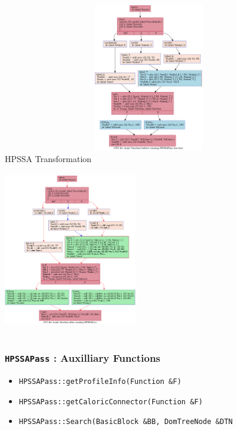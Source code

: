 \documentclass{beamer}
\begin{document}
\begin{frame}{HPSSA Transformation}
	\includegraphics[width=4.8cm,height=7.5cm]{baseline.dot.png}
	\includegraphics[width=5.8cm,height=7.5cm]{withHPSSA.dot.png}
\end{frame}

\begin{frame}
	\frametitle{\texttt{HPSSAPass} : Auxilliary Functions}
	\begin{itemize}
		\item \texttt{HPSSAPass::getProfileInfo(Function \&F)}
		\item \texttt{HPSSAPass::getCaloricConnector(Function \&F)}
		\item \texttt{HPSSAPass::Search(BasicBlock \&BB, DomTreeNode \&DTN} 
	\end{itemize}
\end{frame}
\end{document}
